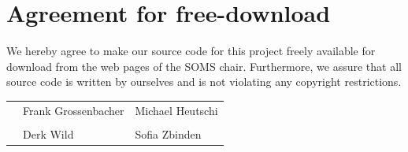 \documentclass[11pt]{article}
\begin{document}

\newpage


\newpage
\section*{Agreement for free-download}
\bigskip


\bigskip


\large We hereby agree to make our source code for this project freely available for download from the web pages of the SOMS chair. Furthermore, we assure that all source code is written by ourselves and is not violating any copyright restrictions.

\begin{center}

\bigskip


\bigskip


\begin{tabular}{@{}p{3.3cm}@{}p{6cm}@{}@{}p{6cm}@{}}
\begin{minipage}{3cm}

\end{minipage}
&
\begin{minipage}{6cm}
\vspace{2mm} \large Frank Grossenbacher

 \vspace{\baselineskip}

\end{minipage}
&
\begin{minipage}{6cm}

\large Michael Heutschi

\end{minipage}

\\  \\&
\begin{minipage}{6cm}
\vspace{2mm} \large Derk Wild

 \vspace{\baselineskip}

\end{minipage}
&
\begin{minipage}{6cm}

\large Sofia Zbinden

\end{minipage}
\end{tabular}


\end{center}
\newpage
\end{document}
